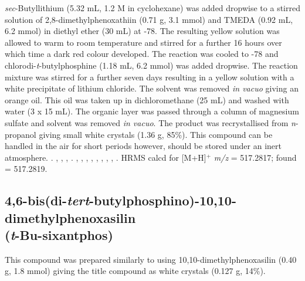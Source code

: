 \noindent{}\emph{sec}-Butyllithium (5.32 mL, 1.2 M in cyclohexane) was added dropwise to a stirred solution of 2,8-dimethylphenoxathiin (0.71 g, 3.1 mmol) and TMEDA (0.92 mL, 6.2 mmol) in diethyl ether (30 mL) at -78\degC{}.  The resulting yellow solution was allowed to warm to room temperature and stirred for a further 16 hours over which time a dark red colour developed.  The reaction was cooled to -78\degC{} and chlorodi-\emph{t}-butylphosphine (1.18 mL, 6.2 mmol) was added dropwise.  The reaction mixture was stirred for a further seven days resulting in a yellow solution with a white precipitate of lithium chloride.  The solvent was removed \emph{in vacuo} giving an orange oil.  This oil was taken up in dichloromethane (25 mL) and washed with water (3 x 15 mL).  The organic layer was passed through a column of magnesium sulfate and solvent was removed \emph{in vacuo}.  The product was recrystallised from \emph{n}-propanol giving small white crystals (1.36 g, 85\%).  This compound can be handled in the air for short periods however, should be stored under an inert atmosphere.
.
,
,
,
.
,
,
,
,
,
,
,
,
.
HRMS calcd for  [M+H]$^+$ \emph{m/z} = 517.2817; found = 517.2819.

\subsection*{4,6-bis(di-\emph{tert}-butylphosphino)-10,10-dimethylphenoxasilin \\(\emph{t}-Bu-sixantphos)}


This compound was prepared similarly to \tButhixantphos{} using 10,10-dimethyl\-phenoxasilin (0.40 g, 1.8 mmol) giving the title compound as white crystals (0.127 g, 14\%).

